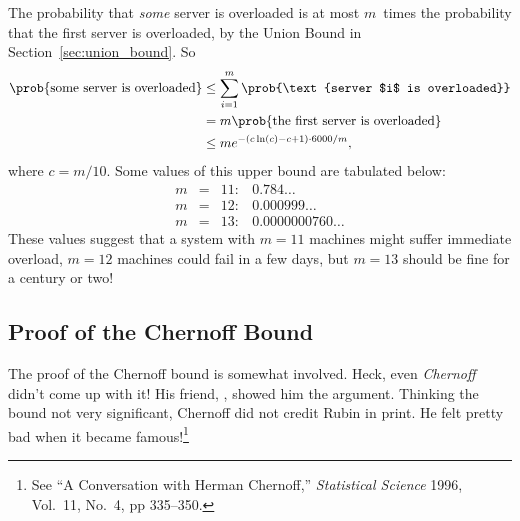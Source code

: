The probability that \emph{some} server is overloaded is at most
$m$~times the probability that the first server is overloaded, by the
Union Bound in Section~\ref{sec:union_bound}.  So
\begin{align*}
\prob{\text{some server is overloaded}}
    &\le \sum_{i = 1}^m \prob{\text{server $i$ is overloaded}} \\
    &= m \prob{\text{the first server is overloaded}} \\
    &\leq m e^{-(c \ln(c) - c + 1) \cdot 6000 / m},
\end{align*}
where $c = m/10$.  Some values of this upper bound are tabulated below:
\[
\begin{array}{rcll}
m & = & 11: & 0.784\dots \\
m & = & 12: & 0.000999\dots \\
m & = & 13: & 0.0000000760\dots
\end{array}
\]
These values suggest that a system with $m = 11$ machines might suffer
immediate overload, $m = 12$ machines could fail in a few days, but $m
= 13$ should be fine for a century or two!

\subsection{Proof of the Chernoff Bound}\label{sec:chernoff_proof}

The proof of the Chernoff bound is somewhat involved.  Heck, even
\emph{Chernoff} didn't come up with it!  His friend, , showed him the argument.  Thinking the bound not very
significant, Chernoff did not credit Rubin in print.  He felt pretty
bad when it became famous!\footnote{See ``A Conversation with Herman
  Chernoff,'' \emph{Statistical Science} 1996, Vol.~11, No.~4, pp
  335--350.}

\iffalse

Here is the theorem again, for reference:

\begin{theorem}[\idx{Chernoff Bound}]
Let $T_1, \dots, T_n$ be mutually independent random variables such
that $0 \leq T_i \leq 1$ for all $i$.  Let $T = T_1 + \cdots + T_n$.
Then for all $c \geq 1$,
\begin{equation}
\prob{T \geq c \expect{T}} \leq e^{-k \expect{T}}
\tag{\ref{chernoff-leq}}
\end{equation}
where $\beta(c) \eqdef c \ln(c) - c + 1$.
\end{theorem}
\fi

